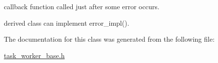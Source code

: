callback function called just after some error occurs. 


\begin{DoxyItemize}
\item derived class can implement error\-\_\-impl(). 
\end{DoxyItemize}

The documentation for this class was generated from the following file\-:\begin{DoxyCompactItemize}
\item 
\hyperlink{task__worker__base_8h}{task\-\_\-worker\-\_\-base.\-h}\end{DoxyCompactItemize}
